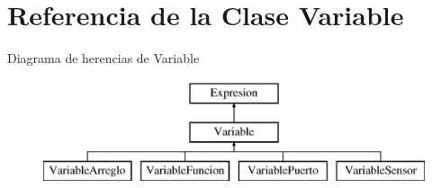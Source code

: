 \hypertarget{class_variable}{\section{Referencia de la Clase Variable}
\label{class_variable}
}
Diagrama de herencias de Variable\begin{figure}[H]
\begin{center}
\leavevmode
\includegraphics[height=3.000000cm]{class_variable}
\end{center}
\end{figure}
